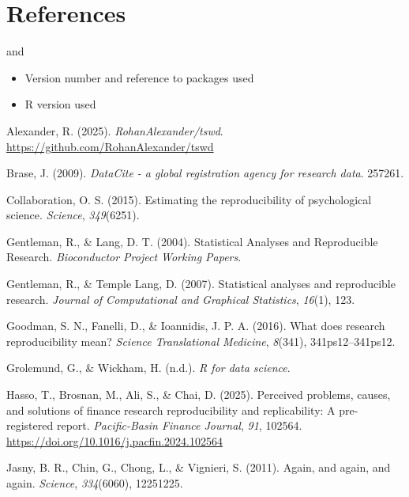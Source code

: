 \documentclass[
  a4paper,
]{article}
\providecommand{\tightlist}{%
  \setlength{\itemsep}{0pt}\setlength{\parskip}{0pt}}\usepackage{longtable,booktabs,array}
\newlength{\cslhangindent}
\newenvironment{CSLReferences}[2] %
 {\begin{list}{}{%
  \setlength{\itemindent}{0pt}
  \setlength{\leftmargin}{0pt}
  \setlength{\parsep}{0pt}
  \ifodd #1
   \setlength{\leftmargin}{\cslhangindent}
   \setlength{\itemindent}{-1\cslhangindent}
  \fi
  \setlength{\itemsep}{#2\baselineskip}}}
 {\end{list}}
\begin{document}
\section{References}\label{references}

and

\begin{itemize}
\tightlist
\item
  Version number and reference to packages used
\item
  R version used
\end{itemize}

\label{refs}
\begin{CSLReferences}{1}{0}
Alexander, R. (2025). \emph{RohanAlexander/tswd}.
\url{https://github.com/RohanAlexander/tswd}

Brase, J. (2009). \emph{DataCite - a global registration agency for
research data}. 257261.

Collaboration, O. S. (2015). Estimating the reproducibility of
psychological science. \emph{Science}, \emph{349}(6251).

Gentleman, R., \& Lang, D. T. (2004). Statistical {Analyses} and
{Reproducible Research}. \emph{Bioconductor Project Working Papers}.

Gentleman, R., \& Temple Lang, D. (2007). Statistical analyses and
reproducible research. \emph{Journal of Computational and Graphical
Statistics}, \emph{16}(1), 123.

Goodman, S. N., Fanelli, D., \& Ioannidis, J. P. A. (2016). What does
research reproducibility mean? \emph{Science Translational Medicine},
\emph{8}(341), 341ps12--341ps12.

Grolemund, G., \& Wickham, H. (n.d.). \emph{R for data science}.

Hasso, T., Brosnan, M., Ali, S., \& Chai, D. (2025). Perceived problems,
causes, and solutions of finance research reproducibility and
replicability: A pre-registered report. \emph{Pacific-Basin Finance
Journal}, \emph{91}, 102564.
\url{https://doi.org/10.1016/j.pacfin.2024.102564}

Jasny, B. R., Chin, G., Chong, L., \& Vignieri, S. (2011). Again, and
again, and again. \emph{Science}, \emph{334}(6060), 12251225.


\end{CSLReferences}
\end{document}
